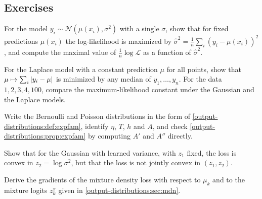 \begin{notechapter}
\section*{Exercises}

\begin{exercise}\label{output-distributions:exr:1}
For the model $y_i\sim\mathcal N(\mu(x_i), \sigma^2)$ with a single $\sigma$, show that for fixed predictions
$\mu(x_i)$ the log-likelihood is maximized by $\hat\sigma^2 = \frac1n\sum_i(y_i - \mu(x_i))^2$, and compute the maximal
value of $\frac1n\log\mathcal L$ as a function of $\hat\sigma^2$.
\end{exercise}

\begin{exercise}\label{output-distributions:exr:2}
For the Laplace model with a constant prediction $\mu$ for all points, show that
$\mu\mapsto\sum_i\left|y_i - \mu\right|$ is minimized by any median of $y_1,\dots,y_n$. For the data
$1, 2, 3, 4, 100$, compare the maximum-likelihood constant under the Gaussian and the
Laplace models.
\end{exercise}

\begin{exercise}\label{output-distributions:exr:3}
Write the Bernoulli and Poisson distributions in the form of
\cref{output-distributions:def:expfam}, identify $\eta$, $T$, $h$ and $A$, and check
\cref{output-distributions:prop:expfam} by computing $A'$ and $A''$ directly.
\end{exercise}

\begin{exercise}\label{output-distributions:exr:4}
Show that for the Gaussian with learned variance, with $z_1$ fixed, the loss is convex
in $z_2 = \log\sigma^2$, but that the loss is not jointly convex in $(z_1, z_2)$.
\end{exercise}

\begin{exercise}\label{output-distributions:exr:5}
Derive the gradients of the mixture density loss with respect to $\mu_k$ and to the
mixture logits $z^\pi_k$ given in \cref{output-distributions:sec:mdn}.
\end{exercise}
\end{notechapter}
